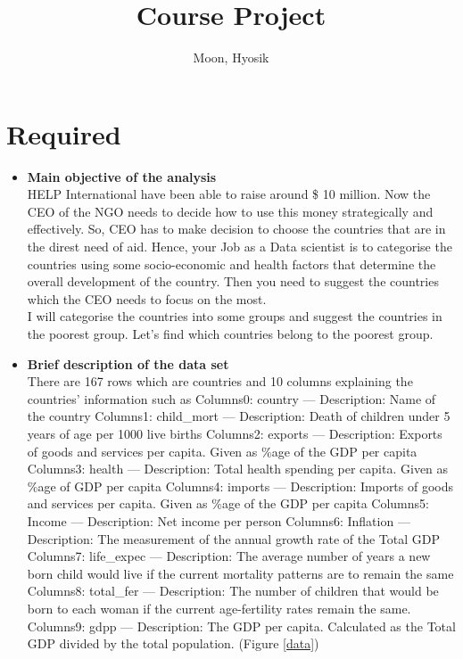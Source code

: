 \documentclass[12pt]{article}
\title{Course Project}
\author{
  Moon, Hyosik
  }
\begin{document}
\maketitle

\section{Required}

\begin{itemize}
\item \textbf{Main objective of the analysis} \\
HELP International have been able to raise around \$ 10 million. Now the CEO of the NGO needs to decide how to use this money strategically and effectively. So, CEO has to make decision to choose the countries that are in the direst need of aid. Hence, your Job as a Data scientist is to categorise the countries using some socio-economic and health factors that determine the overall development of the country. Then you need to suggest the countries which the CEO needs to focus on the most.\\

I will categorise the countries into some groups and suggest the countries in the poorest group. Let's find which countries belong to the poorest group.


\item \textbf{Brief description of the data set} \\
There are 167 rows which are countries and 10 columns explaining the countries' information such as 
Columns0: country --- Description: Name of the country
Columns1: child\_mort --- Description: Death of children under 5 years of age per 1000 live births
Columns2: exports --- Description: Exports of goods and services per capita. Given as \%age of the GDP per capita
Columns3: health --- Description: Total health spending per capita. Given as \%age of GDP per capita
Columns4: imports --- Description: Imports of goods and services per capita. Given as \%age of the GDP per capita
Columns5: Income --- Description: Net income per person
Columns6: Inflation --- Description: The measurement of the annual growth rate of the Total GDP
Columns7: life\_expec --- Description: The average number of years a new born child would live if the current mortality patterns are to remain the same
Columns8: total\_fer --- Description: The number of children that would be born to each woman if the current age-fertility rates remain the same.
Columns9: gdpp --- Description: The GDP per capita. Calculated as the Total GDP divided by the total population.
(Figure \ref{data})


\end{itemize}
\end{document}
